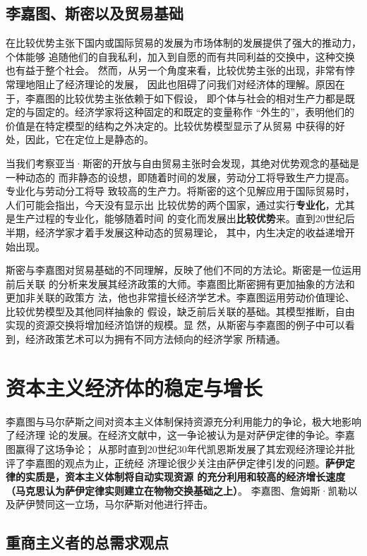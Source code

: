 \subsection{李嘉图、斯密以及贸易基础}

在比较优势主张下国内或国际贸易的发展为市场体制的发展提供了强大的推动力，个体能够
追随他们的自我私利，加入到自愿的而有共同利益的交换中，这种交换也有益于整个社会。
然而，从另一个角度来看，比较优势主张的出现，非常有悖常理地阻止了经济理论的发展，
因此也阻碍了问我们对经济体的理解。原因在于，李嘉图的比较优势主张依赖于如下假设，
即个体与社会的相对生产力都是既定的与固定的。经济学家将这种固定的和既定的变量称作
“外生的”，表明他们的价值是在特定模型的结构之外决定的。比较优势模型显示了从贸易
中获得的好处，因此，它在定位上是静态的。

当我们考察亚当·斯密的开放与自由贸易主张时会发现，其绝对优势观念的基础是一种动态的
而非静态的设想，即随着时间的发展，劳动分工将导致生产力提高。专业化与劳动分工将导
致较高的生产力。将斯密的这个见解应用于国际贸易时，人们可能会指出，今天没有显示出
比较优势的两个国家，通过实行\textbf{专业化}，尤其是生产过程的专业化，能够随着时间
的变化而发展出\textbf{比较优势}来。直到20世纪后半期，经济学家才着手发展这种动态的贸易理论，
其中，内生决定的收益递增开始出现。

斯密与李嘉图对贸易基础的不同理解，反映了他们不同的方法论。斯密是一位运用前后关联
的分析来发展其经济政策的大师。李嘉图比斯密拥有更加抽象的方法和更加非关联的政策方
法，他也非常擅长经济学艺术。李嘉图运用劳动价值理论、比较优势模型及其他同样抽象的
假设，缺乏前后关联的基础。其模型推断，自由实现的资源交换将增加经济馅饼的规模。显
然，从斯密与李嘉图的例子中可以看到，经济政策艺术可以为拥有不同方法倾向的经济学家
所精通。

\section{资本主义经济体的稳定与增长}

李嘉图与马尔萨斯之间对资本主义体制保持资源充分利用能力的争论，极大地影响了经济理
论的发展。在经济文献中，这一争论被认为是对萨伊定律的争论。李嘉图赢得了这场争论；
从那时直到20世纪30年代凯恩斯发展了其宏观经济理论并批评了李嘉图的观点为止，正统经
济理论很少关注由萨伊定律引发的问题。\textbf{萨伊定律的实质是，资本主义体制将自动实现资源
的充分利用和较高的经济增长速度（马克思认为萨伊定律实则建立在物物交换基础之上）}。
李嘉图、詹姆斯·凯勒以及萨伊赞同这一立场，马尔萨斯对他进行抨击。

\subsection{重商主义者的总需求观点}

